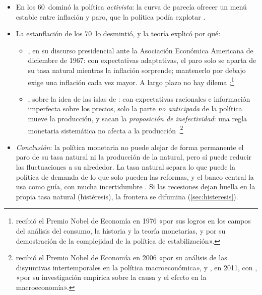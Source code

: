 \documentclass[11pt]{article}
\begin{document}
\begin{itemize}
\item En los 60~dominó la política \emph{activista}: la curva de  parecía ofrecer un menú estable entre inflación y paro, que la política podía explotar\nocite{SamuelsonSolow1960Analytical} .
\item La estanflación de los 70~lo desmintió, y la teoría explicó por qué:
  \begin{itemize}
  \item {}, en su discurso presidencial ante la Asociación Económica Americana de diciembre de 1967\nocite{Friedman1968Role}: con expectativas adaptativas, el paro solo se aparta de su tasa natural mientras la inflación sorprende; mantenerlo por debajo exige una inflación cada vez mayor. A largo plazo no hay dilema ;\footnote{ recibió el Premio Nobel de Economía en 1976 «por sus logros en los campos del análisis del consumo, la historia y la teoría monetarias, y por su demostración de la complejidad de la política de estabilización»\nocite{Nobel1976Friedman}.}
  \item \textcite{Lucas1972Expectations}, sobre la idea de las islas de \textcite{Phelps1970Microeconomic}: con expectativas racionales e información imperfecta sobre los precios, solo la parte \emph{no anticipada} de la política mueve la producción, y \textcite{SargentWallace1975Rational} sacan la \emph{proposición de inefectividad}: una regla monetaria sistemática no afecta a la producción .\footnote{ recibió el Premio Nobel de Economía en 2006 «por su análisis de las disyuntivas intertemporales en la política macroeconómica»\nocite{Nobel2006Phelps}, y , en 2011, con , «por su investigación empírica sobre la causa y el efecto en la macroeconomía»\nocite{Nobel2011SargentSims}.}
  \end{itemize}
\item \emph{Conclusión}: la política monetaria no puede alejar de forma permanente el paro de su tasa natural ni la producción de la natural, pero sí puede reducir las fluctuaciones a su alrededor. La tasa natural separa lo que puede la política de demanda de lo que solo pueden las reformas, y el banco central la usa como guía, con mucha incertidumbre . Si las recesiones dejan huella en la propia tasa natural (histéresis), la frontera se difumina (\ref{sec:histeresis}).
\end{itemize}
\end{document}
